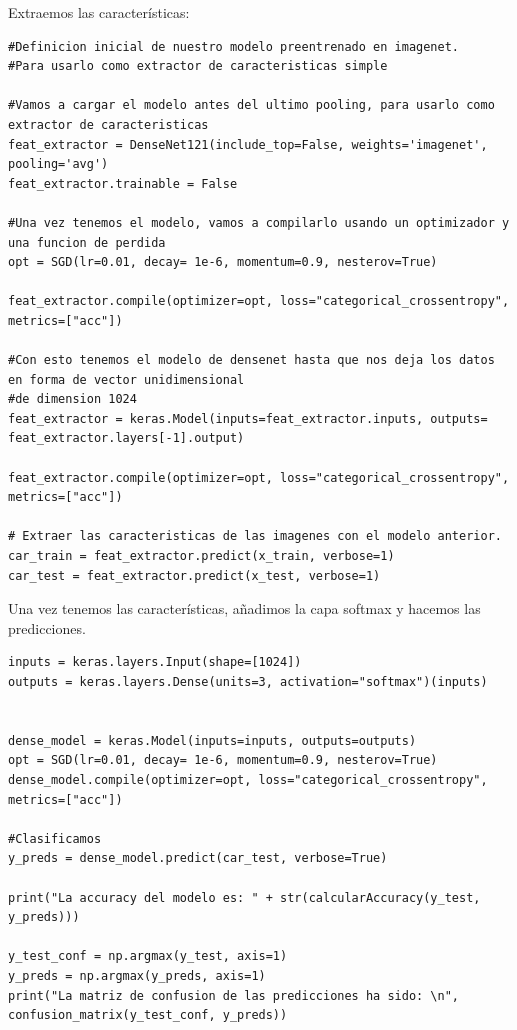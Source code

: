 \documentclass[11pt,a4paper]{article}
\theoremstyle{definition}
\begin{document}
Extraemos las características:

\begin{lstlisting}
#Definicion inicial de nuestro modelo preentrenado en imagenet.
#Para usarlo como extractor de caracteristicas simple

#Vamos a cargar el modelo antes del ultimo pooling, para usarlo como extractor de caracteristicas
feat_extractor = DenseNet121(include_top=False, weights='imagenet', pooling='avg')
feat_extractor.trainable = False

#Una vez tenemos el modelo, vamos a compilarlo usando un optimizador y una funcion de perdida
opt = SGD(lr=0.01, decay= 1e-6, momentum=0.9, nesterov=True)

feat_extractor.compile(optimizer=opt, loss="categorical_crossentropy", metrics=["acc"])

#Con esto tenemos el modelo de densenet hasta que nos deja los datos en forma de vector unidimensional
#de dimension 1024
feat_extractor = keras.Model(inputs=feat_extractor.inputs, outputs= feat_extractor.layers[-1].output)

feat_extractor.compile(optimizer=opt, loss="categorical_crossentropy", metrics=["acc"])

# Extraer las caracteristicas de las imagenes con el modelo anterior.
car_train = feat_extractor.predict(x_train, verbose=1)
car_test = feat_extractor.predict(x_test, verbose=1)
\end{lstlisting}

Una vez tenemos las características, añadimos la capa softmax y hacemos las predicciones.

\begin{lstlisting}
inputs = keras.layers.Input(shape=[1024])
outputs = keras.layers.Dense(units=3, activation="softmax")(inputs)


dense_model = keras.Model(inputs=inputs, outputs=outputs)
opt = SGD(lr=0.01, decay= 1e-6, momentum=0.9, nesterov=True)
dense_model.compile(optimizer=opt, loss="categorical_crossentropy", metrics=["acc"])

#Clasificamos
y_preds = dense_model.predict(car_test, verbose=True)

print("La accuracy del modelo es: " + str(calcularAccuracy(y_test, y_preds)))

y_test_conf = np.argmax(y_test, axis=1)
y_preds = np.argmax(y_preds, axis=1)
print("La matriz de confusion de las predicciones ha sido: \n", confusion_matrix(y_test_conf, y_preds))
\end{lstlisting}
\end{document}
